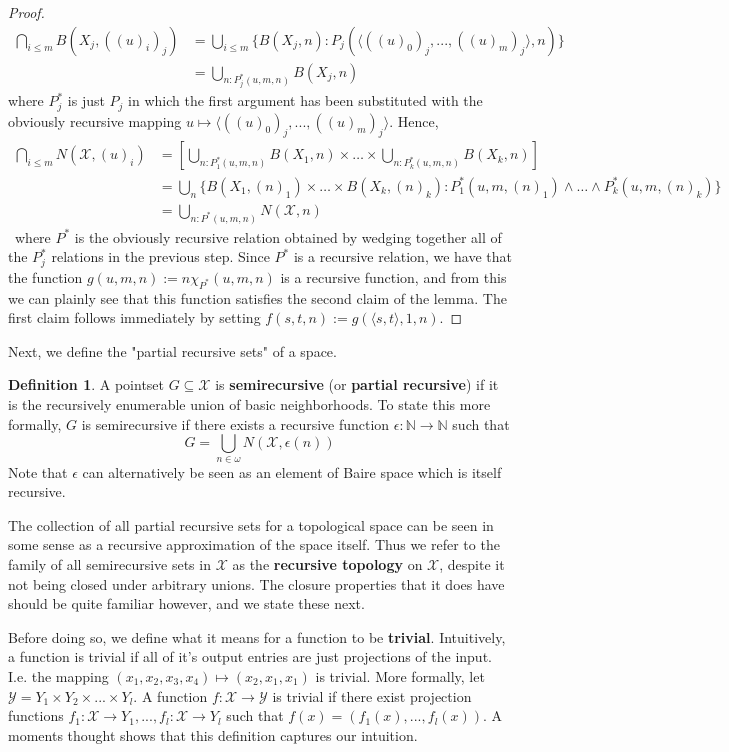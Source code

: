 \documentclass{article}
\theoremstyle{definition}
\newtheorem{definition}{Definition}[section]
\theoremstyle{plain}
\begin{document}
\begin{proof}
\begin{align}
	\bigcap_{i \leq m} B(X_j,((u)_i)_j) &= \bigcup_{i \leq m} \{B(X_j,n): P_j(\langle ((u)_0)_j,...,((u)_m)_j \rangle,n) \}\\
		&= \bigcup_{n: P^*_j(u,m,n)} B(X_j,n)
\end{align}
where $P^*_j$ is just $P_j$ in which the first argument has been substituted with the obviously recursive mapping $u \mapsto \langle ((u)_0)_j,...,((u)_m)_j \rangle$. Hence,
\begin{align}
	\bigcap_{i \leq m} N(\mathcal{X},(u)_i) &= \left[ \bigcup_{n: P_1^*(u,m,n)} B(X_1,n) \times \ldots \times \bigcup_{n: P^*_k(u,m,n)} B(X_k,n)\right] \\
		&= \bigcup_n \{ B(X_1,(n)_1) \times \ldots \times B(X_k,(n)_k): P^*_1(u,m,(n)_1) \wedge \ldots \wedge P^*_k(u,m,(n)_k) \} \\
		&= \bigcup_{n: P^*(u,m,n)} N(\mathcal{X},n)
\end{align} \
where $P^*$ is the obviously recursive relation obtained by wedging together all of the $P^*_j$ relations in the previous step. Since $P^*$ is a recursive relation, we have that the function $g(u,m,n) := n\chi_{P^*}(u,m,n)$ is a recursive function, and from this we can plainly see that this function satisfies the second claim of the lemma. The first claim follows immediately by setting $f(s,t,n) := g(\langle s,t \rangle,1,n)$.
\end{proof}
Next, we define the "partial recursive sets" of a space.
\begin{definition}
    A pointset $G \subseteq \mathcal{X}$ is \textbf{semirecursive} (or \textbf{partial recursive}) if it is the recursively enumerable union of basic neighborhoods. To state this more formally, $G$ is semirecursive if there exists a recursive function $\epsilon:\mathbb{N} \to \mathbb{N}$ such that
    \[ G = \bigcup_{n \in \omega} N(\mathcal{X},\epsilon(n)) \]
    Note that $\epsilon$ can alternatively be seen as an element of Baire space which is itself recursive.
\end{definition}
The collection of all partial recursive sets for a topological space can be seen in some sense as a recursive approximation of the space itself. Thus we refer to the family of all semirecursive sets in $\mathcal{X}$ as the \textbf{recursive topology} on $\mathcal{X}$, despite it not being closed under arbitrary unions. The closure properties that it does have should be quite familiar however, and we state these next.
\par Before doing so, we define what it means for a function to be \textbf{trivial}. Intuitively, a function is trivial if all of it's output entries are just projections of the input. I.e. the mapping $(x_1,x_2,x_3,x_4) \mapsto (x_2,x_1,x_1)$ is trivial. More formally, let $\mathcal{Y} = Y_1 \times Y_2 \times ... \times Y_l$. A function $f: \mathcal{X} \to \mathcal{Y}$ is trivial if there exist projection functions $f_1:\mathcal{X} \to Y_1,...,f_l:\mathcal{X} \to Y_l$ such that $f(x) = (f_1(x),...,f_l(x))$. A moments thought shows that this definition captures our intuition.
\end{document}
